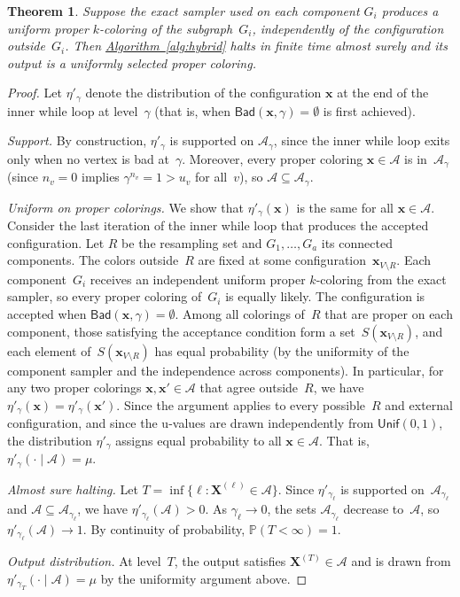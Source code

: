 \documentclass[12pt, a4paper]{article}
\theoremstyle{plain}
\newtheorem{theorem}{Theorem}
\theoremstyle{definition}
\theoremstyle{remark}
\newcommand{\mc}{\mathcal}
\renewcommand{\v}[1]{\boldsymbol{#1}}
\newcommand{\pp}{\mathbb{P}}
\newcommand{\mx}{\v{x}}
\newcommand{\mX}{\v{X}}
\newcommand{\sref}[2]{\hyperref[#2]{#1~\ref*{#2}}}
\newcommand{\unif}{\mathsf{Unif}}
\newcommand{\bad}{\mathsf{Bad}}
\begin{document}
\begin{theorem}\label{thm:hybrid_correct}
Suppose the exact sampler used on each component \(G_i\) produces a uniform proper \(k\)-coloring of the subgraph~\(G_i\), independently of the configuration outside~\(G_i\). Then \sref{Algorithm}{alg:hybrid} halts in finite time almost surely and its output is a uniformly selected proper coloring.
\end{theorem}
\begin{proof}
Let \(\eta'_{\gamma}\) denote the distribution of the configuration \(\mx\) at the end of the inner while loop at level~\(\gamma\) (that is, when \(\bad(\mx,\gamma)=\emptyset\) is first achieved).

{\em Support.}
By construction, \(\eta'_\gamma\) is supported on \(\mc A_\gamma\), since the inner while loop exits only when no vertex is bad at~\(\gamma\). Moreover, every proper coloring \(\mx\in\mc A\) is in~\(\mc A_\gamma\) (since \(n_v=0\) implies \(\gamma^{n_v}=1>u_v\) for all~\(v\)), so \(\mc A\subseteq\mc A_\gamma\).

{\em Uniform on proper colorings.}
We show that \(\eta'_\gamma(\mx)\) is the same for all \(\mx\in\mc A\). Consider the last iteration of the inner while loop that produces the accepted configuration. Let \(R\) be the resampling set and \(G_1,\ldots,G_a\) its connected components. The colors outside~\(R\) are fixed at some configuration~\(\mx_{V\setminus R}\). Each component~\(G_i\) receives an independent uniform proper \(k\)-coloring from the exact sampler, so every proper coloring of~\(G_i\) is equally likely. The configuration is accepted when \(\bad(\mx,\gamma)=\emptyset\). Among all colorings of~\(R\) that are proper on each component, those satisfying the acceptance condition form a set~\(S(\mx_{V\setminus R})\), and each element of~\(S(\mx_{V\setminus R})\) has equal probability (by the uniformity of the component sampler and the independence across components). In particular, for any two proper colorings \(\mx,\mx'\in\mc A\) that agree outside~\(R\), we have \(\eta'_\gamma(\mx)=\eta'_\gamma(\mx')\). Since the argument applies to every possible~\(R\) and external configuration, and since the u-values are drawn independently from \(\unif(0,1)\), the distribution \(\eta'_\gamma\) assigns equal probability to all \(\mx\in\mc A\). That is, \(\eta'_\gamma(\cdot\mid\mc A) = \mu\).

{\em Almost sure halting.}
Let \(T=\inf\{\ell:\mX^{(\ell)}\in\mc A\}\). Since \(\eta'_{\gamma_\ell}\) is supported on~\(\mc A_{\gamma_\ell}\) and \(\mc A\subseteq\mc A_{\gamma_\ell}\), we have \(\eta'_{\gamma_\ell}(\mc A)>0\). As \(\gamma_\ell\to0\), the sets \(\mc A_{\gamma_\ell}\) decrease to~\(\mc A\), so \(\eta'_{\gamma_\ell}(\mc A)\to1\). By continuity of probability, \(\pp(T<\infty)=1\).

{\em Output distribution.}
At level~\(T\), the output satisfies \(\mX^{(T)}\in\mc A\) and is drawn from \(\eta'_{\gamma_T}(\cdot\mid\mc A)=\mu\) by the uniformity argument above.
\end{proof}
\end{document}
